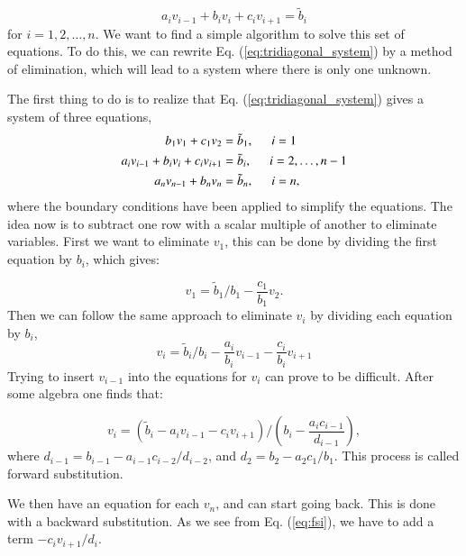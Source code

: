 \documentclass{article}
\begin{document}
\begin{multicols}{2}
\begin{equation}\label{eq:tridiagonal_system}
  a_iv_{i-1}+b_iv_i+c_iv_{i+1} = \tilde{b}_i
\end{equation}
for $i=1,2,\dots,n$. We want to find a simple algorithm to solve this set of equations. To do this, we can rewrite Eq. (\ref{eq:tridiagonal_system}) by a method of elimination, which will lead to a system where there is only one unknown. 

The first thing to do is to realize that Eq. (\ref{eq:tridiagonal_system}) gives a system of three equations,
\begin{align}
	b_1 v_1 + c_1 v_2 &= \tilde{b}_1, \hspace{0.5cm} i = 1  \\
	a_i v_{i-1} + b_i v_i + c_i v_{i+1} &= \tilde{b}_i, \hspace{0.5cm} i = 2, \dots, n - 1 \\
	a_n v_{n-1} + b_n v_n &= \tilde{b}_n, \hspace{0.5cm} i = n  ,
\end{align}
where the boundary conditions have been applied to simplify the equations. The idea now is to subtract one row with a scalar multiple of another to eliminate variables. First we want to eliminate $v_1$, this can be done by dividing the first equation by $b_i$, which gives:

\begin{equation}
	v_1 = \tilde{b}_1/b_1 - \frac{c_1}{b_1}v_2.
\end{equation}
Then we can follow the same approach to eliminate $v_i$ by dividing each equation by $b_i$,\\

\begin{equation}
	v_i = \tilde{b}_i/b_i - \frac{a_i}{b_i}v_{i-1} - \frac{c_i}{b_i}v_{i+1}
\end{equation}
Trying to insert $v_{i-1}$ into the equations for $v_i$ can prove to be difficult. After some algebra one finds that:

\begin{equation}\label{eq:fsi}
	v_i = \left( \tilde{b}_i - a_iv_{i-1} - c_iv_{i+1} \right)/\left( b_i - \frac{a_ic_{i-1}}{d_{i-1}} \right),
\end{equation}
where $d_{i-1} =  b_{i-1} - a_{i-1}c_{i-2}/d_{i-2}$, and $d_{2} = b_2 - a_2c_1/b_1$. This process is called forward substitution.

We then have an equation for each $v_n$, and can start going back. This is done with a backward substitution. As we see from Eq. (\ref{eq:fsi}), we have to add a term $-c_iv_{i+1}/d_i$. \\




\end{multicols}
\end{document}
